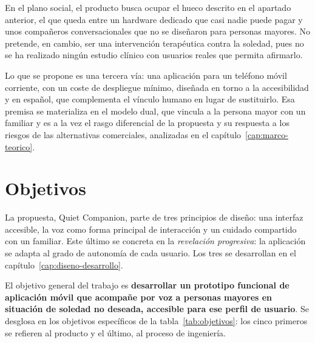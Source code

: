 En el plano social, el producto busca ocupar el hueco descrito en el apartado anterior, el que queda entre un hardware dedicado que casi nadie puede pagar y unos compañeros conversacionales que no se diseñaron para personas mayores. No pretende, en cambio, ser una intervención terapéutica contra la soledad, pues no se ha realizado ningún estudio clínico con usuarios reales que permita afirmarlo.

Lo que se propone es una tercera vía: una aplicación para un teléfono móvil corriente, con un coste de despliegue mínimo, diseñada en torno a la accesibilidad y en español, que complementa el vínculo humano en lugar de sustituirlo. Esa premisa se materializa en el modelo dual, que vincula a la persona mayor con un familiar y es a la vez el rasgo diferencial de la propuesta y su respuesta a los riesgos de las alternativas comerciales, analizadas en el capítulo~\ref{cap:marco-teorico}.

\section{Objetivos}

La propuesta, Quiet Companion, parte de tres principios de diseño: una interfaz accesible, la voz como forma principal de interacción y un cuidado compartido con un familiar. Este último se concreta en la \textit{revelación progresiva}: la aplicación se adapta al grado de autonomía de cada usuario. Los tres se desarrollan en el capítulo~\ref{cap:diseno-desarrollo}.

El objetivo general del trabajo es \textbf{desarrollar un prototipo funcional de aplicación móvil que acompañe por voz a personas mayores en situación de soledad no deseada, accesible para ese perfil de usuario}. Se desglosa en los objetivos específicos de la tabla~\ref{tab:objetivos}: los cinco primeros se refieren al producto y el último, al proceso de ingeniería.

